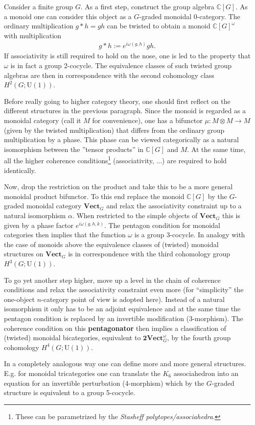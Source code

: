     Consider a finite group $G$. As a first step, construct the group algebra $\mathbb{C}[G]$. As a monoid one can consider this object as a $G$-graded monoidal 0-category. The ordinary multiplication $g\ast h=gh$ can be twisted to obtain a monoid $\mathbb{C}[G]^\omega$ with multiplication
    \begin{gather}
        g\ast h := e^{i\omega(g, h)}gh.
    \end{gather}
    If associativity is still required to hold on the nose, one is led to the property that $\omega$ is in fact a group 2-cocycle. The equivalence classes of such twisted group algebras are then in correspondence with the second cohomology class $H^2(G; \text{U}(1))$.

    Before really going to higher category theory, one should first reflect on the different structures in the previous paragraph. Since the monoid is regarded as a monoidal category (call it $M$ for convenience), one has a bifunctor $\mu:M\otimes M\rightarrow M$ (given by the twisted multiplication) that differs from the ordinary group multiplication by a phase. This phase can be viewed categorically as a natural isomorphism between the ''tensor products'' in $\mathbb{C}[G]$ and $M$. At the same time, all the higher coherence conditions\footnote{These can be parametrized by the \textit{Stasheff polytopes/associahedra}.} (associativity, ...) are required to hold identically.

    Now, drop the restriction on the product and take this to be a more general monoidal product bifunctor. To this end replace the monoid $\mathbb{C}[G]$ by the $G$-graded monoidal category $\mathbf{Vect}_G$ and relax the associativity constraint up to a natural isomorphism $\alpha$. When restricted to the simple objects of $\mathbf{Vect}_G$ this is given by a phase factor $e^{i\omega(g,h,k)}$. The pentagon condition for monoidal categories then implies that the function $\omega$ is a group 3-cocycle. In analogy with the case of monoids above the equivalence classes of (twisted) monoidal structures on $\mathbf{Vect}_G$ is in correspondence with the third cohomology group $H^3(G; \text{U}(1))$.

    To go yet another step higher, move up a level in the chain of coherence conditions and relax the associativity constraint even more (for ``simplicity'' the one-object $n$-category point of view is adopted here). Instead of a natural isomorphism it only has to be an adjoint equivalence and at the same time the pentagon condition is replaced by an invertible modification (3-morphism). The coherence condition on this \textbf{pentagonator} then implies a classification of (twisted) monoidal bicategories, equivalent to $\mathbf{2Vect}_G^\omega$, by the fourth group cohomology $H^4(G; \text{U}(1))$.

    In a completely analogous way one can define more and more general structures. E.g. for monoidal tricategories one can translate the $K_6$ associahedron into an equation for an invertible perturbation (4-morphism) which by the $G$-graded structure is equivalent to a group 5-cocycle.

